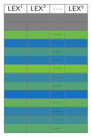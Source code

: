 \begin{figure}
\centering
\[
\def\colS{LimeGreen}
\def\colL{RoyalBlue}
\def\lightgray{gray}
\begin{array}{|c|c|c|c|}
\hline
\lex^{1} & \lex^{2} & \cdots & \lex^{q} \\ \hline
\cellcolor{\lightgray} & \cellcolor{\lightgray} & \cellcolor{\lightgray} & \cellcolor{\lightgray} \\ \hline
\cellcolor{\lightgray} & \cellcolor{\lightgray} & \cellcolor{\lightgray} & \cellcolor{\lightgray} \\ \hline
\cellcolor{\colL!16!\colS}  & \cellcolor{\colL!16!\colS}  & \cellcolor{\colL!16!\colS} \cdots  & \cellcolor{\colL!16!\colS}  \\ \hline
\cellcolor{\colL!91!\colS}  & \cellcolor{\colL!91!\colS}  & \cellcolor{\colL!91!\colS} \cdots  & \cellcolor{\colL!91!\colS}  \\ \hline
\cellcolor{\colL!50!\colS}  & \cellcolor{\colL!50!\colS}  & \cellcolor{\colL!50!\colS} \cdots  & \cellcolor{\colL!50!\colS}  \\ \hline
\cellcolor{\colL!83!\colS}  & \cellcolor{\colL!83!\colS}  & \cellcolor{\colL!83!\colS} \cdots  & \cellcolor{\colL!83!\colS}  \\ \hline
\cellcolor{\colL!8!\colS}   & \cellcolor{\colL!8!\colS}   & \cellcolor{\colL!8!\colS}  \cdots  & \cellcolor{\colL!8!\colS}   \\ \hline
\cellcolor{\colL!66!\colS}  & \cellcolor{\colL!66!\colS}  & \cellcolor{\colL!66!\colS} \cdots  & \cellcolor{\colL!66!\colS}  \\ \hline
\cellcolor{\colL!41!\colS}  & \cellcolor{\colL!41!\colS}  & \cellcolor{\colL!41!\colS} \cdots  & \cellcolor{\colL!41!\colS}  \\ \hline
\cellcolor{\colL!100!\colS} & \cellcolor{\colL!100!\colS} & \cellcolor{\colL!100!\colS} \cdots & \cellcolor{\colL!100!\colS} \\ \hline
\cellcolor{\colL!25!\colS}  & \cellcolor{\colL!25!\colS}  & \cellcolor{\colL!25!\colS} \cdots  & \cellcolor{\colL!25!\colS}  \\ \hline
\cellcolor{\colL!75!\colS}  & \cellcolor{\colL!75!\colS}  & \cellcolor{\colL!75!\colS} \cdots  & \cellcolor{\colL!75!\colS}  \\ \hline
\cellcolor{\colL!58!\colS}  & \cellcolor{\colL!58!\colS}  & \cellcolor{\colL!58!\colS} \cdots  & \cellcolor{\colL!58!\colS}  \\ \hline
\cellcolor{\colL!33!\colS}  & \cellcolor{\colL!33!\colS}  & \cellcolor{\colL!33!\colS} \cdots  & \cellcolor{\colL!33!\colS}  \\ \hline

\end{array}\]
\end{figure}
